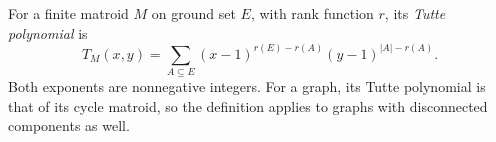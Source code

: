 
For a finite matroid $M$ on ground set $E$, with rank function $r$, its \emph{Tutte polynomial} is
\[
T_M(x,y)=\sum_{A\subseteq E}(x-1)^{r(E)-r(A)}(y-1)^{|A|-r(A)}.
\]
Both exponents are nonnegative integers. For a graph, its Tutte polynomial is that of its cycle matroid, so the definition applies to graphs with disconnected components as well.

